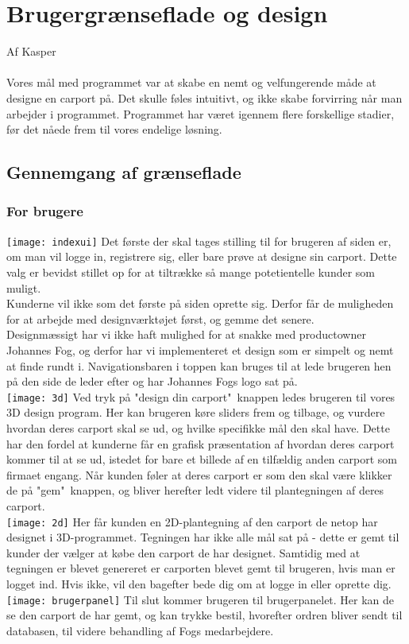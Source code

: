 \section{Brugergrænseflade og design}
Af Kasper\\\\
Vores mål med programmet var at skabe en nemt og velfungerende måde at designe en carport på.
Det skulle føles intuitivt, og ikke skabe forvirring når man arbejder i programmet.
Programmet har været igennem flere forskellige stadier, før det nåede frem til vores endelige løsning.
\\
\subsection{Gennemgang af grænseflade}
\subsubsection{For brugere}
\texttt{[image: indexui]}
Det første der skal tages stilling til for brugeren af siden er, om man vil logge in, registrere sig, eller bare prøve at designe sin carport.
Dette valg er bevidst stillet op for at tiltrække så mange potetientelle kunder som muligt.\\
Kunderne vil ikke som det første på siden oprette sig. Derfor får de muligheden for at arbejde med designværktøjet først, og gemme det senere.\\
Designmæssigt har vi ikke haft mulighed for at snakke med productowner Johannes Fog, og derfor har vi implementeret et design som er simpelt og nemt at finde rundt i.
Navigationsbaren i toppen kan bruges til at lede brugeren hen på den side de leder efter og har Johannes Fogs logo sat på.\\
\texttt{[image: 3d]}
Ved tryk på "design din carport"\ knappen ledes brugeren til vores 3D design program. Her kan brugeren køre sliders frem og tilbage, og vurdere hvordan deres carport skal se ud, og hvilke specifikke mål den skal have. Dette har den fordel at kunderne får en grafisk præsentation af hvordan deres carport kommer til at se ud, istedet for bare et billede af en tilfældig anden carport som firmaet engang. Når kunden føler at deres carport er som den skal være klikker de på "gem"\ knappen, og bliver herefter ledt videre til plantegningen af deres carport.\\
\texttt{[image: 2d]}
Her får kunden en 2D-plantegning af den carport de netop har designet i 3D-programmet. Tegningen har ikke alle mål sat på - dette er gemt til kunder der vælger at købe den carport de har designet. Samtidig med at tegningen er blevet genereret er carporten blevet gemt til brugeren, hvis man er logget ind. Hvis ikke, vil den bagefter bede dig om at logge in eller oprette dig.\\
\texttt{[image: brugerpanel]}
Til slut kommer brugeren til brugerpanelet. Her kan de se den carport de har gemt, og kan trykke bestil, hvorefter ordren bliver sendt til databasen, til videre behandling af Fogs medarbejdere. \\
